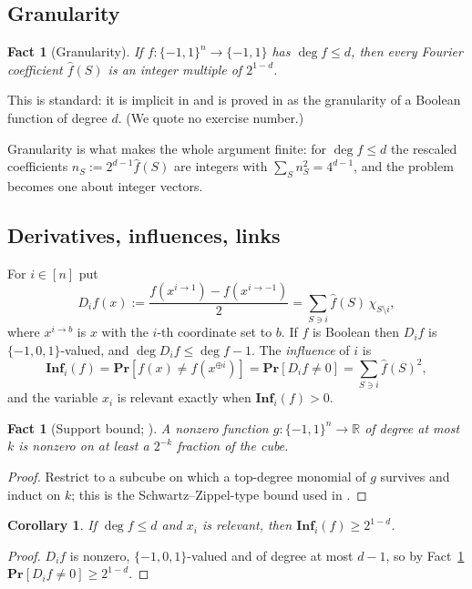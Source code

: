 \documentclass[11pt,reqno]{amsart}
\theoremstyle{plain}
\newtheorem{corollary}[theorem]{Corollary}
\newtheorem{fact}[theorem]{Fact}
\theoremstyle{definition}
\numberwithin{theorem}{section}
\newcommand{\cube}{\{-1,1\}}
\newcommand{\bits}{\{-1,0,1\}}
\newcommand{\Inf}{\mathbf{Inf}}
\newcommand{\Prb}{\mathbf{Pr}}
\newcommand{\bbR}{\mathbb{R}}
\newcommand{\Fhat}[1]{\widehat{#1}}
\DeclareMathOperator{\Deg}{deg}
\begin{document}
\subsection{Granularity}
\begin{fact}[Granularity]\label{fact:gran}
If $f \colon \cube^n \to \cube$ has $\Deg f \le d$, then every Fourier coefficient
$\Fhat{f}(S)$ is an integer multiple of $2^{1-d}$.
\end{fact}

This is standard: it is implicit in \cite{NS94} and is proved in \cite{ODbook} as the
granularity of a Boolean function of degree $d$. (We quote no exercise number.)

Granularity is what makes the whole argument finite: for $\Deg f \le d$ the rescaled
coefficients $n_S := 2^{d-1}\Fhat{f}(S)$ are integers with $\sum_S n_S^2 = 4^{d-1}$, and the
problem becomes one about integer vectors.

\subsection{Derivatives, influences, links}
For $i \in [n]$ put
\[
  D_i f(x) := \frac{f(x^{i \to 1}) - f(x^{i \to -1})}{2}
  = \sum_{S \ni i} \Fhat{f}(S)\,\chi_{S \setminus i},
\]
where $x^{i \to b}$ is $x$ with the $i$-th coordinate set to $b$. If $f$ is Boolean then $D_i f$
is $\bits$-valued, and $\Deg D_i f \le \Deg f - 1$. The \emph{influence} of $i$ is
\[
  \Inf_i(f) = \Prb\left[ f(x) \ne f(x^{\oplus i}) \right] = \Prb[D_i f \ne 0]
  = \sum_{S \ni i} \Fhat{f}(S)^2 ,
\]
and the variable $x_i$ is relevant exactly when $\Inf_i(f) > 0$.

\begin{fact}[Support bound; {\cite{NS94}}]\label{fact:support}
A nonzero function $g \colon \cube^n \to \bbR$ of degree at most $k$ is nonzero on at least a
$2^{-k}$ fraction of the cube.
\end{fact}

\begin{proof}
Restrict to a subcube on which a top-degree monomial of $g$ survives and induct on $k$; this is
the Schwartz--Zippel-type bound used in \cite{NS94}.
\end{proof}

\begin{corollary}\label{cor:minfluence}
If $\Deg f \le d$ and $x_i$ is relevant, then $\Inf_i(f) \ge 2^{1-d}$.
\end{corollary}

\begin{proof}
$D_i f$ is nonzero, $\bits$-valued and of degree at most $d - 1$, so by Fact~\ref{fact:support}
$\Prb[D_i f \ne 0] \ge 2^{1-d}$.
\end{proof}
\end{document}
